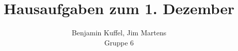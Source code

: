 \documentclass[10pt,a4paper,oneside,ngerman,numbers=noenddot]{scrartcl}
\begin{document}
\author{Benjamin Kuffel, Jim Martens\\Gruppe 6}
\title{Hausaufgaben zum 1. Dezember}
\maketitle

\setcounter{section}{3}
\section{} %
\end{document}
